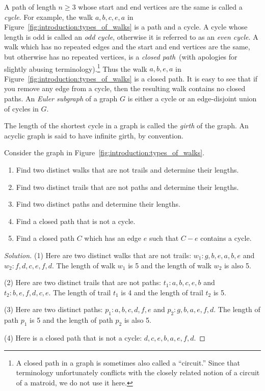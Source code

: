 A path of length $n \geq 3$ whose start and end vertices are the same
is called a \emph{cycle}. For example, the walk $a, b, c, e, a$
in Figure~\ref{fig:introduction:types_of_walks} is a path and a
cycle. A cycle whose length is odd is called an
\emph{odd cycle}, otherwise it is referred to as an
\emph{even cycle}. A walk which has no repeated
edges and the start and end vertices are the same, but otherwise has
no repeated vertices, is
a \emph{closed path}~(with apologies for slightly abusing
terminology).\footnote{
A closed path in a graph is sometimes also called a ``circuit.'' Since
that terminology unfortunately conflicts with the closely related
notion of a circuit of a matroid, we do not use it here.}
Thus the walk $a, b, e, a$ in
Figure~\ref{fig:introduction:types_of_walks} is a closed path. It is
easy to see that if you remove any edge from a cycle, then the
resulting walk contains no closed paths. An \emph{Euler subgraph} of a
graph $G$ is either a cycle or an edge-disjoint union of cycles in
$G$.

The length of the shortest cycle in a graph is called the \emph{girth}
of the graph. An acyclic graph is said to have infinite girth, by
convention.

\begin{example}
\label{eg:introduction:walks_paths_trails}
Consider the graph in Figure~\ref{fig:introduction:types_of_walks}.
%
\begin{enumerate}
\item Find two distinct walks that are not trails and determine their
  lengths.

\item Find two distinct trails that are not paths and determine their
  lengths.

\item Find two distinct paths and determine their lengths.

\item Find a closed path that is not a cycle.

\item Find a closed path $C$ which has an edge $e$ such that $C - e$
  contains a cycle.
\end{enumerate}
\end{example}

\begin{proof}[Solution]
(1) Here are two distinct walks that are not trails:
$w_1: g, b, e, a, b, e$ and $w_2: f, d, c, e, f, d$. The length of
walk $w_1$ is 5 and the length of walk $w_2$ is also 5.

(2) Here are two distinct trails that are not paths:
$t_1: a,b,c,e,b$ and $t_2: b,e,f,d,c,e$. The length of trail $t_1$ is
4 and the length of trail $t_2$ is 5.

(3) Here are two distinct paths: $p_1: a, b, c, d, f, e$ and
$p_2: g, b, a, e, f, d$. The length of path $p_1$ is 5 and the length
of path $p_2$ is also 5.

(4) Here is a closed path that is not a cycle: $d, c, e, b, a, e, f, d$.
\end{proof}

